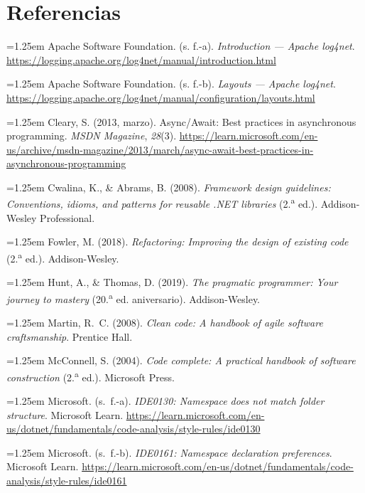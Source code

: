 \section{Referencias}

\begingroup
\small

\noindent\hangindent=1.25em Apache Software Foundation. (s. f.-a). \textit{Introduction --- Apache log4net}. \url{https://logging.apache.org/log4net/manual/introduction.html}

\smallskip
\noindent\hangindent=1.25em Apache Software Foundation. (s. f.-b). \textit{Layouts --- Apache log4net}. \url{https://logging.apache.org/log4net/manual/configuration/layouts.html}

\smallskip
\noindent\hangindent=1.25em Cleary, S. (2013, marzo). Async/Await: Best practices in asynchronous programming. \textit{MSDN Magazine}, \textit{28}(3). \url{https://learn.microsoft.com/en-us/archive/msdn-magazine/2013/march/async-await-best-practices-in-asynchronous-programming}

\smallskip
\noindent\hangindent=1.25em Cwalina, K., \& Abrams, B. (2008). \textit{Framework design guidelines: Conventions, idioms, and patterns for reusable .NET libraries} (2.\textsuperscript{a} ed.). Addison-Wesley Professional.

\smallskip
\noindent\hangindent=1.25em Fowler, M. (2018). \textit{Refactoring: Improving the design of existing code} (2.\textsuperscript{a} ed.). Addison-Wesley.

\smallskip
\noindent\hangindent=1.25em Hunt, A., \& Thomas, D. (2019). \textit{The pragmatic programmer: Your journey to mastery} (20.\textsuperscript{a} ed. aniversario). Addison-Wesley.

\smallskip
\noindent\hangindent=1.25em Martin, R.~C. (2008). \textit{Clean code: A handbook of agile software craftsmanship}. Prentice Hall.

\smallskip
\noindent\hangindent=1.25em McConnell, S. (2004). \textit{Code complete: A practical handbook of software construction} (2.\textsuperscript{a} ed.). Microsoft Press.

\smallskip
\noindent\hangindent=1.25em Microsoft. (s.~f.-a). \textit{IDE0130: Namespace does not match folder structure}. Microsoft Learn. \url{https://learn.microsoft.com/en-us/dotnet/fundamentals/code-analysis/style-rules/ide0130}

\smallskip
\noindent\hangindent=1.25em Microsoft. (s.~f.-b). \textit{IDE0161: Namespace declaration preferences}. Microsoft Learn. \url{https://learn.microsoft.com/en-us/dotnet/fundamentals/code-analysis/style-rules/ide0161}

